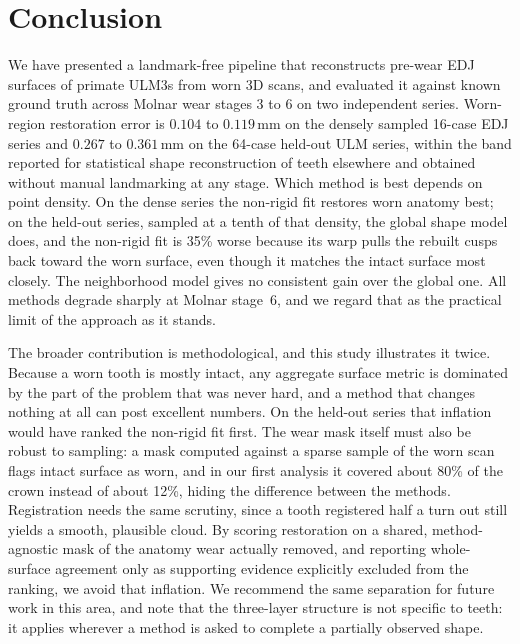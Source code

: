 \documentclass[10pt,a4paper,twocolumn]{article}
\newcommand{\mm}{\,\mathrm{mm}}
\begin{document}
\section{Conclusion}
\label{sec:conclusion}

We have presented a landmark-free pipeline that reconstructs pre-wear EDJ
surfaces of primate ULM3s from worn 3D scans, and evaluated it against known
ground truth across Molnar wear stages 3 to 6 on two independent series.
Worn-region restoration error is $0.104$ to $0.119\mm$ on the densely sampled
16-case EDJ series and $0.267$ to $0.361\mm$ on the 64-case held-out ULM series,
within the band reported for statistical shape reconstruction of teeth elsewhere
and obtained without manual landmarking at any stage. Which method is best depends
on point density. On the dense series the non-rigid fit restores worn anatomy
best; on the held-out series, sampled at a tenth of that density, the global shape
model does, and the non-rigid fit is 35\% worse because its warp pulls the rebuilt
cusps back toward the worn surface, even though it matches the intact surface
most closely. The neighborhood model gives no consistent gain over the global one.
All methods degrade sharply at Molnar stage~6, and we regard that as the practical
limit of the approach as it stands.

The broader contribution is methodological, and this study illustrates it twice.
Because a worn tooth is mostly intact, any aggregate surface metric is dominated
by the part of the problem that was never hard, and a method that changes nothing
at all can post excellent numbers. On the held-out series that inflation would
have ranked the non-rigid fit first. The wear mask itself must also be robust to
sampling: a mask computed against a sparse sample of the worn scan flags intact
surface as worn, and in our first analysis it covered about 80\% of the crown
instead of about 12\%, hiding the difference between the methods. Registration
needs the same scrutiny, since a tooth registered half a turn out still yields a
smooth, plausible cloud. By scoring restoration on a shared, method-agnostic mask of the anatomy
wear actually removed, and reporting whole-surface agreement only as supporting
evidence explicitly excluded from the ranking, we avoid that inflation. We
recommend the same separation for future work in this area, and note that the
three-layer structure is not specific to teeth: it applies wherever a method is
asked to complete a partially observed shape.
\end{document}
